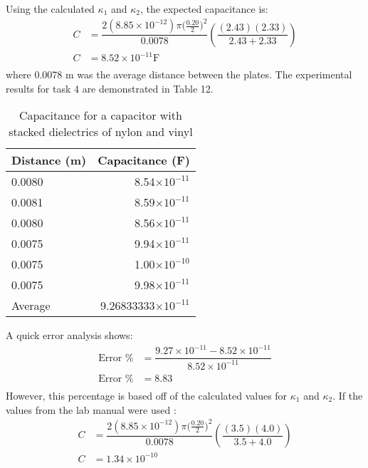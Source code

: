 \documentclass [12pt, letterpaper, twoside] {article}
\begin{document}
\begin{enumerate}
  Using the calculated \(\kappa_{1}\) and \(\kappa_{2}\), the expected capacitance is:
  \begin{equation*}
    \begin{split}
      C &= \dfrac{2(8.85\times10^{-12})\pi{(\tfrac{0.20}{2}})^2}{0.0078}\left(\dfrac{(2.43)(2.33)}{2.43 + 2.33}\right) \\ %
      C &= 8.52\times10^{-11} \text{F}\\ %
    \end{split}
  \end{equation*}
  where 0.0078 m was the average distance between the plates.
  The experimental results for task 4 are demonstrated in Table 12. 
  \begin{table}[h!]
    \centering
    \begin{tabular}{| l | r |}
      \hline\hline
      Distance (m) & Capacitance (F) \\
      \hline
      0.0080 & 8.54\(\times10^{-11}\) \\
      \hline
      0.0081 & 8.59\(\times10^{-11}\) \\
      \hline
      0.0080 & 8.56\(\times10^{-11}\) \\
      \hline
      0.0075 & 9.94\(\times10^{-11}\) \\
      \hline
      0.0075 & 1.00\(\times10^{-10}\) \\
      \hline
      0.0075 & 9.98\(\times10^{-11}\) \\
      \hline
      Average & 9.26833333\(\times10^{-11}\) \\
      \hline
      \hline\hline
    \end{tabular}
    \caption{Capacitance for a capacitor with stacked dielectrics of nylon and vinyl}
  \end{table} 
  A quick error analysis shows:
  \begin{equation*}
    \begin{split}
      \text{Error \%} &= \dfrac{9.27\times10^{-11} - 8.52\times10^{-11}}{8.52\times10^{-11}} \\ %
      \text{Error \%} &= 8.83 \\ %
    \end{split}
  \end{equation*}
  However, this percentage is based off of the calculated values for \(\kappa_{1}\) and \(\kappa_{2}\). If the values from the lab manual were used \cite{labManual}:
  \begin{equation*}
    \begin{split}
      C &= \dfrac{2(8.85\times10^{-12})\pi{(\tfrac{0.20}{2}})^2}{0.0078}\left(\dfrac{(3.5)(4.0)}{3.5 + 4.0}\right) \\ %
      C &= 1.34\times10^{-10} \\ %
    \end{split}
  \end{equation*}


\end{enumerate}
\end{document}
